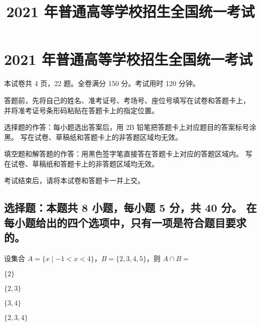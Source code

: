 \documentclass{exam-zh}
\title{2021 年普通高等学校招生全国统一考试}
\begin{document}
\tableofcontents

\chapter{2021 年普通高等学校招生全国统一考试}


\secret

\maketitle

本试卷共 4 页，22 题。全卷满分 150 分。考试用时 120 分钟。

\goodluck

\begin{notice}
  \item 答题前，先将自己的姓名、准考证号、考场号、座位号填写在试卷和答题卡上，
    并将准考证号条形码粘贴在答题卡上的指定位置。
  \item 选择题的作答：每小题选出答案后，用 2B 铅笔把答题卡上对应题目的答案标号涂黑。
    写在试卷、草稿纸和答题卡上的非答题区域均无效。
  \item 填空题和解答题的作答：用黑色签字笔直接答在答题卡上对应的答题区域内。
    写在试卷、草稿纸和答题卡上的非答题区域均无效。
  \item 考试结束后，请将本试卷和答题卡一并上交。
\end{notice}



\section{%
  选择题：本题共 8 小题，每小题 5 分，共 40 分。
  在每小题给出的四个选项中，只有一项是符合题目要求的。
}

\begin{question}[points = 2]
  设集合 $A = \{x \mid -1 < x < 4\}$，$B = \{2, 3, 4, 5\}$，则 $A \cap B = $ \paren[B]

  \begin{choices}
    \item $\{2\}$
    \item $\{2, 3\}$
    \item $\{3, 4\}$
    \item $\{2, 3, 4\}$
  \end{choices}
\end{question}
\end{document}
